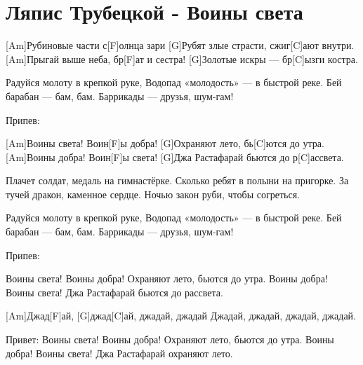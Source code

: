 \section{Ляпис Трубецкой - Воины света}
\begin{guitar}

[Am]Рубиновые части с[F]олнца зари
[G]Рубят злые страсти, сжиг[C]ают внутри.
[Am]Прыгай выше неба, бр[F]ат и сестра!
[G]Золотые искры — бр[C]ызги костра.

Радуйся молоту в крепкой руке,
Водопад «молодость» — в быстрой реке.
Бей барабан — бам, бам.
Баррикады — друзья, шум-гам!

Припев:

[Am]Воины света! Воин[F]ы добра!
[G]Охраняют лето, бь[C]ются до утра.
[Am]Воины добра! Воин[F]ы света!
[G]Джа Растафарай бьются до р[C]ассвета.

Плачет солдат, медаль на гимнастёрке.
Сколько ребят в полыни на пригорке.
За тучей дракон, каменное сердце.
Ночью закон руби, чтобы согреться.

Радуйся молоту в крепкой руке,
Водопад «молодость» — в быстрой реке.
Бей барабан — бам, бам.
Баррикады — друзья, шум-гам!

Припев:

Воины света! Воины добра!
Охраняют лето, бьются до утра.
Воины добра! Воины света!
Джа Растафарай бьются до рассвета.

[Am]Джад[F]ай, [G]джад[C]ай, джадай, джадай
Джадай, джадай, джадай, джадай.

Привет:
Воины света! Воины добра!
Охраняют лето, бьются до утра.
Воины добра! Воины света!
Джа Растафарай охраняют лето.
\end{guitar}
